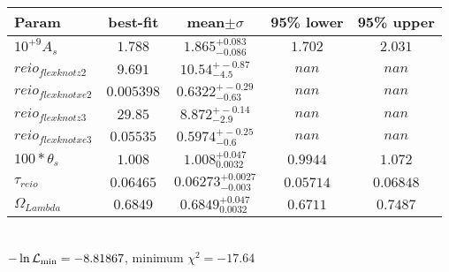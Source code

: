 \begin{tabular}{|l|c|c|c|c|} 
 \hline 
Param & best-fit & mean$\pm\sigma$ & 95\% lower & 95\% upper \\ \hline 
$10^{+9}A_{s }$ &$1.788$ & $1.865_{-0.086}^{+0.083}$ & $1.702$ & $2.031$ \\ 
$reio_{flexknot z  2 }$ &$9.691$ & $10.54_{-4.5}^{+-0.87}$ & $nan$ & $nan$ \\ 
$reio_{flexknot xe  2 }$ &$0.005398$ & $0.6322_{-0.63}^{+-0.29}$ & $nan$ & $nan$ \\ 
$reio_{flexknot z  3 }$ &$29.85$ & $8.872_{-2.9}^{+-0.14}$ & $nan$ & $nan$ \\ 
$reio_{flexknot xe  3 }$ &$0.05535$ & $0.5974_{-0.6}^{+-0.25}$ & $nan$ & $nan$ \\ 
$100*\theta{}_{s }$ &$1.008$ & $1.008_{0.0032}^{+0.047}$ & $0.9944$ & $1.072$ \\ 
$\tau{}_{reio }$ &$0.06465$ & $0.06273_{-0.003}^{+0.0027}$ & $0.05714$ & $0.06848$ \\ 
$\Omega{}_{Lambda }$ &$0.6849$ & $0.6849_{0.0032}^{+0.047}$ & $0.6711$ & $0.7487$ \\ 
\hline 
 \end{tabular} \\ 
$-\ln{\cal L}_\mathrm{min} =-8.81867$, minimum $\chi^2=-17.64$ \\ 
